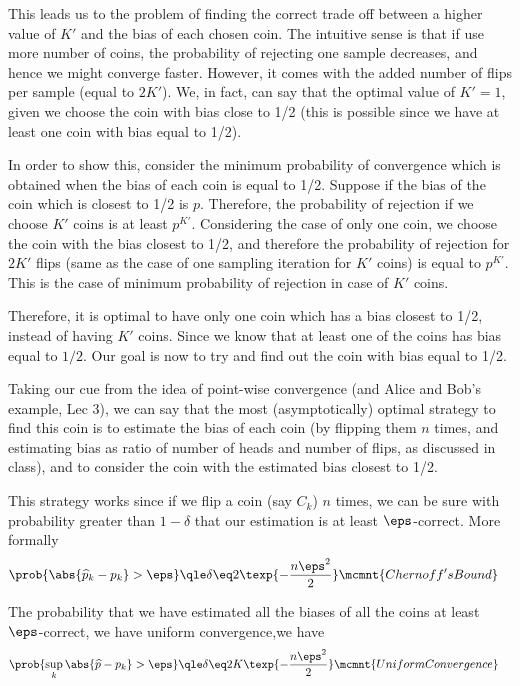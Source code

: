 \documentclass[a4paper,10pt]{article}
\begin{document}
\begin{question}
	This leads us to the problem of finding the correct trade off between a higher value of $K'$ and the bias of each chosen coin. The intuitive sense is that if use more number of coins, the probability of rejecting one sample decreases, and hence we might converge faster. However, it comes with the added number of flips per sample (equal to $2 K'$). We, in fact, can say that the optimal value of $K' = 1$, given we choose the coin with bias close to 1/2 (this is possible since we have at least one coin with bias equal to 1/2).

	In order to show this, consider the minimum probability of convergence which is obtained when the bias of each coin is equal to 1/2. Suppose if the bias of the coin which is closest to 1/2 is $p$. Therefore, the probability of rejection if we choose $K'$ coins is at least $p^{K'}$. Considering the case of only one coin, we choose the coin with the bias closest to 1/2, and therefore the probability of rejection for $2 K'$ flips (same as the case of one sampling iteration for $K'$ coins) is equal to $p^{K'}$. This is the case of minimum probability of rejection in case of $K'$ coins.

	Therefore, it is optimal to have only one coin which has a bias closest to 1/2, instead of having $K'$ coins.
	Since we know that at least one of the coins has bias equal to $1/2$.
	Our goal is now to try and find out the coin with bias equal to 1/2.

	Taking our cue from the idea of point-wise convergence (and Alice and Bob's example, Lec 3), we can say that the most (asymptotically) optimal strategy to find this coin is to estimate the bias of each coin (by flipping them $n$ times, and estimating bias as ratio of number of heads and number of flips, as discussed in class), and to consider the coin with the estimated bias closest to 1/2.

	This strategy works since if we flip a coin (say $C_k$) $n$ times, we can be sure with probability greater than $1 - \delta$ that our estimation is at least $\eps$-correct.
	More formally
	\begin{align*}
		\prob{\abs{\widehat{p}_k - p_k} > \eps}	&\qle	\delta	\eq	2\texp{- \frac{n \eps^2}{2}} \mcmnt{Chernoff's Bound}
	\end{align*}

	The probability that we have estimated all the biases of all the coins at least $\eps$-correct, \ie we have uniform convergence,we have
	\begin{align*}
		\prob{\sup_k \abs{\widehat{p} - p_k} > \eps}	&\qle	\delta	\eq	2K \texp{- \frac{n \eps^2}{2}}	\mcmnt{Uniform Convergence}
	\end{align*}


\end{question}
\end{document}
